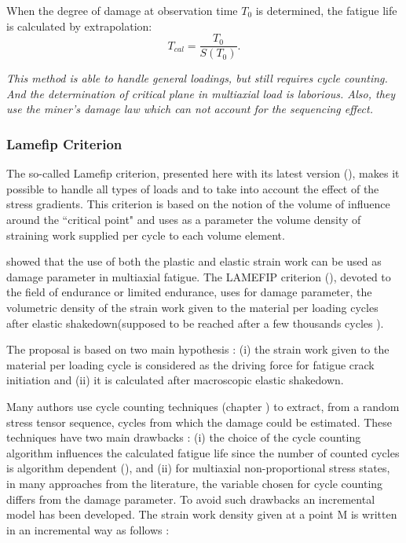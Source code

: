 When the degree of damage at observation time $T_0$ is
determined, the fatigue life is calculated by extrapolation:
$$T_{cal}=\dfrac{T_0}{S(T_0)}.$$

\textit{This method is able to handle general loadings, but still requires cycle counting. And the determination of critical plane in multiaxial load is laborious. Also, they use the miner's damage law which can not account for the sequencing effect.}

\subsubsection{Lamefip Criterion}
The so-called Lamefip criterion, presented here with its latest version (\cite{benabes2006approche}), makes it possible to handle all types of loads and to take into account the effect of the stress gradients. This criterion is based on the notion of the volume of influence around the ``critical point" and uses as a parameter the volume density of straining work supplied per cycle to each volume element.

\cite{ellyin2012fatigue} showed that the use of both the plastic and elastic strain work can be used
as damage parameter in multiaxial fatigue. The LAMEFIP criterion (\cite{banvillet2003volumetric}),
devoted to the field of endurance or limited endurance, uses for damage parameter, the volumetric density of the strain work given to the material per loading cycles after elastic shakedown(supposed to be reached after a few thousands cycles ).

The proposal is based on two main hypothesis : (i) the strain work given to the material per loading cycle is considered as the driving force for fatigue crack initiation and (ii) it is calculated after macroscopic elastic shakedown.

Many authors use cycle counting techniques (chapter \cite{chp:4}) to extract, from a random stress tensor sequence, cycles from which the damage could be estimated. These techniques have two main drawbacks : (i) the choice of the cycle counting algorithm influences the calculated fatigue life since the number of counted cycles is algorithm dependent (\cite{dowling1983fatigue}), and (ii) for multiaxial non-proportional stress states, in many approaches from the literature, the variable chosen for cycle counting differs from the damage parameter. To avoid such drawbacks an incremental model has been developed. The strain work density given at a point M is written in an incremental way as follows :

